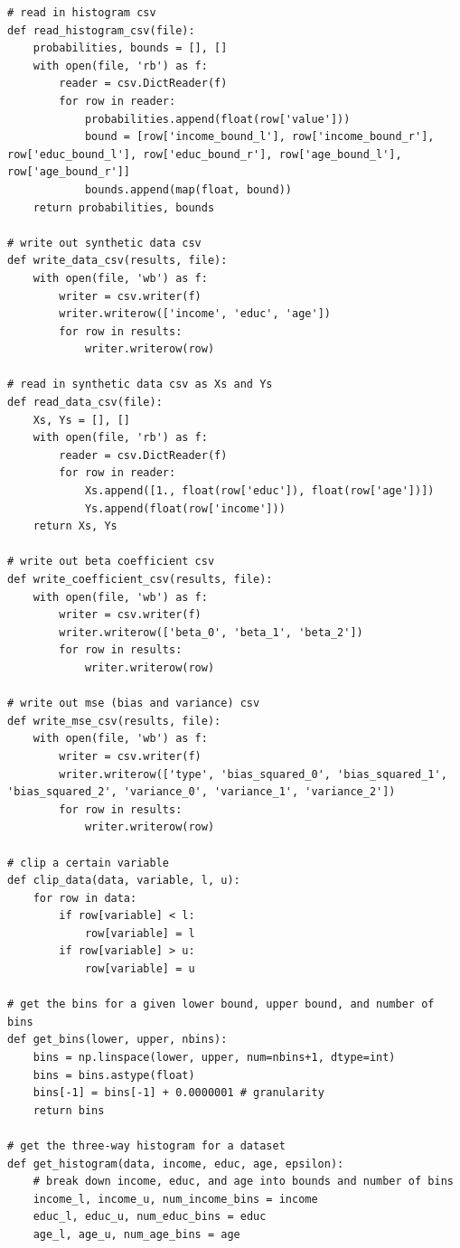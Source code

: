 \documentclass[12pt]{article}
\begin{document}
\begin{appendices}
\begin{lstlisting}
# read in histogram csv
def read_histogram_csv(file):
    probabilities, bounds = [], []
    with open(file, 'rb') as f:
        reader = csv.DictReader(f)
        for row in reader:
            probabilities.append(float(row['value']))
            bound = [row['income_bound_l'], row['income_bound_r'], row['educ_bound_l'], row['educ_bound_r'], row['age_bound_l'], row['age_bound_r']]
            bounds.append(map(float, bound))
    return probabilities, bounds

# write out synthetic data csv
def write_data_csv(results, file):
    with open(file, 'wb') as f:
        writer = csv.writer(f)
        writer.writerow(['income', 'educ', 'age'])
        for row in results:
            writer.writerow(row)

# read in synthetic data csv as Xs and Ys
def read_data_csv(file):
    Xs, Ys = [], []
    with open(file, 'rb') as f:
        reader = csv.DictReader(f)
        for row in reader:
            Xs.append([1., float(row['educ']), float(row['age'])])
            Ys.append(float(row['income']))
    return Xs, Ys

# write out beta coefficient csv
def write_coefficient_csv(results, file):
    with open(file, 'wb') as f:
        writer = csv.writer(f)
        writer.writerow(['beta_0', 'beta_1', 'beta_2'])
        for row in results:
            writer.writerow(row)

# write out mse (bias and variance) csv
def write_mse_csv(results, file):
    with open(file, 'wb') as f:
        writer = csv.writer(f)
        writer.writerow(['type', 'bias_squared_0', 'bias_squared_1', 'bias_squared_2', 'variance_0', 'variance_1', 'variance_2'])
        for row in results:
            writer.writerow(row)

# clip a certain variable
def clip_data(data, variable, l, u):
    for row in data:
        if row[variable] < l:
            row[variable] = l
        if row[variable] > u:
            row[variable] = u

# get the bins for a given lower bound, upper bound, and number of bins
def get_bins(lower, upper, nbins):
    bins = np.linspace(lower, upper, num=nbins+1, dtype=int)
    bins = bins.astype(float)
    bins[-1] = bins[-1] + 0.0000001 # granularity
    return bins

# get the three-way histogram for a dataset
def get_histogram(data, income, educ, age, epsilon):
    # break down income, educ, and age into bounds and number of bins
    income_l, income_u, num_income_bins = income
    educ_l, educ_u, num_educ_bins = educ
    age_l, age_u, num_age_bins = age


\end{lstlisting}
\end{appendices}
\end{document}
